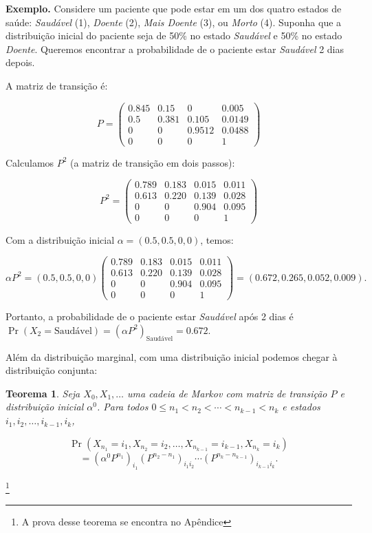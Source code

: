 \documentclass[12pt]{article}
\theoremstyle{break}
\newtheorem{theorem}{Teorema}[section]
\begin{document}
\textbf{Exemplo.} Considere um paciente que pode estar em um dos quatro estados de saúde: \textit{Saudável} (1), \textit{Doente} (2), \textit{Mais Doente} (3), ou \textit{Morto} (4). Suponha que a distribuição inicial do paciente seja de 50\% no estado \textit{Saudável} e 50\% no estado \textit{Doente}. Queremos encontrar a probabilidade de o paciente estar \textit{Saudável} 2 dias depois.

A matriz de transição é:

\[
P = \begin{pmatrix}
    0.845 & 0.15 & 0 & 0.005 \\
    0.5 & 0.381 & 0.105 & 0.0149 \\
    0 & 0 & 0.9512 & 0.0488 \\
    0 & 0 & 0 & 1
\end{pmatrix}
\]

Calculamos \( P^2 \) (a matriz de transição em dois passos):

\[
P^2 = \begin{pmatrix}
    0.789 & 0.183 & 0.015 & 0.011 \\
    0.613 & 0.220 & 0.139 & 0.028 \\
    0 & 0 &0.904 & 0.095 \\
    0 & 0 & 0 & 1
\end{pmatrix}
\]

Com a distribuição inicial \( \alpha = (0.5, 0.5, 0, 0) \), temos:

\[
\alpha P^2 = (0.5, 0.5, 0, 0) \begin{pmatrix}
    0.789 & 0.183 & 0.015 & 0.011 \\
    0.613 & 0.220 & 0.139 & 0.028 \\
    0 & 0 &0.904 & 0.095 \\
    0 & 0 & 0 & 1
\end{pmatrix} = (0.672, 0.265, 0.052, 0.009).
\]

Portanto, a probabilidade de o paciente estar \textit{Saudável} após 2 dias é \( \Pr(X_2 = \text{Saudável}) = (\alpha P^2)_{\text{Saudável}} = 0.672 \).

Além da distribuição marginal, com uma distribuição inicial podemos chegar à distribuição conjunta:


\begin{theorem}
Seja \( X_0, X_1, \dots \) uma cadeia de Markov com matriz de transição \( P \) e distribuição inicial \( \alpha^0 \). Para todos \( 0 \leq n_1 < n_2 < \cdots < n_{k-1} < n_k \) e estados \( i_1, i_2, \dots, i_{k-1}, i_k \),

\[
\Pr(X_{n_1} = i_1, X_{n_2} = i_2, \dots, X_{n_{k-1}} = i_{k-1}, X_{n_k} = i_k)
\]
\[
= (\alpha^0 P^{n_1})_{i_1} (P^{n_2 - n_1})_{i_1 i_2} \cdots (P^{n_k - n_{k-1}})_{i_{k-1} i_k}.
\]

\end{theorem}\footnote{A prova desse teorema se encontra no Apêndice}
\end{document}
